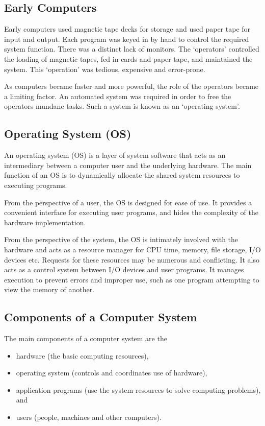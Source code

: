\subsection{Early Computers}

Early computers used magnetic tape decks for storage and used paper tape for input and output.
Each program was keyed in by hand to control the required system function.
There was a distinct lack of monitors.
The `operators' controlled the loading of magnetic tapes, fed in cards and paper tape, and maintained the system.
This `operation' was tedious, expensive and error-prone.

As computers became faster and more powerful, the role of the operators became a limiting factor.
An automated system was required in order to free the operators mundane tasks.
Such a system is known as an `operating system'.

\subsection{Operating System (OS)}

An operating system (OS) is a layer of system software that acts as an intermediary between a computer user and the underlying hardware.
The main function of an OS is to dynamically allocate the shared system resources to executing programs.

From the perspective of a user, the OS is designed for ease of use.
It provides a convenient interface for executing user programs, and hides the complexity of the hardware implementation.

From the perspective of the system, the OS is intimately involved with the hardware and acts as a resource manager for CPU time, memory, file storage, I/O devices etc.
Requests for these resources may be numerous and conflicting.
It also acts as a control system between I/O devices and user programs.
It manages execution to prevent errors and improper use, such as one program attempting to view the memory of another.

\subsection{Components of a Computer System}

The main components of a computer system are the
\begin{itemize}
  \item hardware (the basic computing resources),
  \item operating system (controls and coordinates use of hardware),
  \item application programs (use the system resources to solve computing problems), and
  \item users (people, machines and other computers).
\end{itemize}

